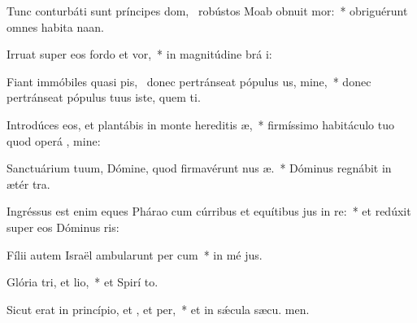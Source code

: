 \item Tunc conturbáti sunt príncipes dom,~\pscross{} robústos Moab obnuit mor:~* obriguérunt omnes habita naan.
\item Irruat super eos fordo et vor,~* in magnitúdine brá i:
\item Fiant immóbiles quasi pis,~\pscross{} donec pertránseat pópulus us, mine,~* donec pertránseat pópulus tuus iste, quem ti.
\item Introdúces eos, et plantábis in monte hereditis æ,~* firmíssimo habitáculo tuo quod operá , mine:
\item Sanctuárium tuum, Dómine, quod firmavérunt nus æ.~* Dóminus regnábit in ætér  tra.
\item Ingréssus est enim eques Phárao cum cúrribus et equítibus jus in re:~* et redúxit super eos Dóminus  ris:
\item Fílii autem Israël ambularunt per cum~* in mé jus.
\item Glória tri, et lio,~* et Spirí to.
\item Sicut erat in princípio, et , et per,~* et in sǽcula sæcu. men.
